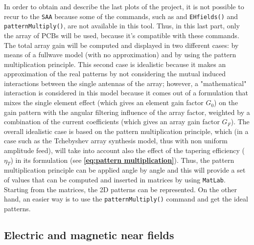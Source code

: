 \documentclass[10 pt,a4paper,twocolumn]{article}
\begin{document}
{In order to obtain and describe the last plots of the project, it is not possible to recur to the \texttt{\color{Mahogany}SAA} because some of the commands, such as  and \texttt{EHfields()} and \texttt{patternMultiply()}, are not available in this tool. Thus, in this last part, only the array of PCBs will be used, because it's compatible with these commands. The total array gain will be computed and displayed in two different cases: by means of a fullwave model (with no approximation) and by using the pattern multiplication principle. This second case is idealistic because it makes an approximation of the real patterns by not considering the mutual induced interactions between the single antennas of the array; however, a "mathematical" interaction is considered in this model because it comes out of a formulation that mixes the single element effect (which gives an element gain factor $G_0$) on the gain pattern with the angular filtering influence of the array factor, weighted by a combination of the current coefficients (which gives an array gain factor $G_F$). The overall idealistic case is based on the pattern multiplication principle, which (in a case such as the Tchebyshev array synthesis model, thus with non uniform amplitude feed), will take into account also the effect of the tapering efficiency ($\eta_T$) in its formulation (see \textbf{\cref{eq:pattern multiplication}}). Thus, the pattern multiplication principle can be applied angle by angle and this will provide a set of values that can be computed and inserted in matrices by using \texttt{\color{BurntOrange}MatLab}. Starting from the matrices, the 2D patterns can be represented. On the other hand, an easier way is to use the \texttt{patternMultiply()} command and get the ideal patterns. 


\subsection*{Electric and magnetic near fields}

}
\end{document}
